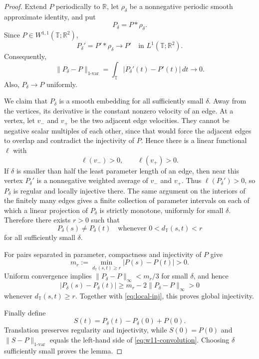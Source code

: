 \documentclass[11pt,reqno]{amsart}
\theoremstyle{definition}
\theoremstyle{remark}
\newcommand{\R}{\mathbb{R}}
\newcommand{\T}{\mathbb{T}}
\begin{document}
\begin{proof}
Extend \(P\) periodically to \(\R\), let \(\rho_\delta\) be a nonnegative
periodic smooth approximate identity, and put
\[
 P_\delta=P*\rho_\delta.
\]
Since \(P\in W^{1,1}(\T;\R^2)\),
\[
 P_\delta' =P'*\rho_\delta\longrightarrow P'
 \quad\text{in }L^1(\T;\R^2).
\]
Consequently,
\begin{equation}\label{eq:w11-convolution}
 \lVert P_\delta-P\rVert_{1\text{-var}}
 =\int_{\T}|P_\delta'(t)-P'(t)|\,dt
 \longrightarrow0.
\end{equation}
Also, \(P_\delta\to P\) uniformly.

We claim that \(P_\delta\) is a smooth embedding for all sufficiently small
\(\delta\).  Away from the vertices, its derivative is the constant nonzero
velocity of an edge.  At a vertex, let \(v_-\) and \(v_+\) be the two adjacent
edge velocities.  They cannot be negative scalar multiples of each other,
since that would force the adjacent edges to overlap and contradict the
injectivity of \(P\).  Hence there is a linear functional \(\ell\) with
\[
 \ell(v_-)>0,
 \qquad
 \ell(v_+)>0.
\]
If \(\delta\) is smaller than half the least parameter length of an edge, then
near this vertex \(P_\delta'\) is a nonnegative weighted average of \(v_-\) and
\(v_+\).  Thus \(\ell(P_\delta')>0\), so \(P_\delta\) is regular and locally
injective there.  The same argument on the interiors of the finitely many
edges gives a finite collection of parameter intervals on each of which a
linear projection of \(P_\delta\) is strictly monotone, uniformly for small
\(\delta\).  Therefore there exists \(r>0\) such that
\begin{equation}\label{eq:local-inj}
 P_\delta(s)\neq P_\delta(t)
 \quad\text{whenever }0<d_{\T}(s,t)<r
\end{equation}
for all sufficiently small \(\delta\).

For pairs separated in parameter, compactness and injectivity of \(P\) give
\[
 m_r:=\min_{d_{\T}(s,t)\geq r}|P(s)-P(t)|>0.
\]
Uniform convergence implies
\(\lVert P_\delta-P\rVert_\infty<m_r/3\) for small \(\delta\), and hence
\[
 |P_\delta(s)-P_\delta(t)|
 \geq m_r-2\lVert P_\delta-P\rVert_\infty>0
\]
whenever \(d_{\T}(s,t)\geq r\).  Together with
\eqref{eq:local-inj}, this proves global injectivity.

Finally define
\[
 S(t)=P_\delta(t)-P_\delta(0)+P(0).
\]
Translation preserves regularity and injectivity, while \(S(0)=P(0)\) and
\(\lVert S-P\rVert_{1\text{-var}}\) equals the left-hand side of
\eqref{eq:w11-convolution}.  Choosing \(\delta\) sufficiently small proves
the lemma.
\end{proof}
\end{document}
